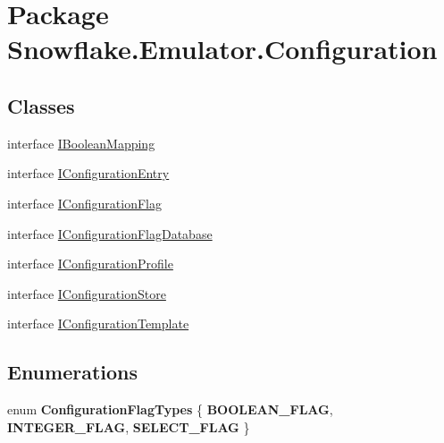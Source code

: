 \hypertarget{namespace_snowflake_1_1_emulator_1_1_configuration}{}\section{Package Snowflake.\+Emulator.\+Configuration}
\label{namespace_snowflake_1_1_emulator_1_1_configuration}
\subsection*{Classes}
\begin{DoxyCompactItemize}
\item 
interface \hyperlink{interface_snowflake_1_1_emulator_1_1_configuration_1_1_i_boolean_mapping}{I\+Boolean\+Mapping}
\item 
interface \hyperlink{interface_snowflake_1_1_emulator_1_1_configuration_1_1_i_configuration_entry}{I\+Configuration\+Entry}
\item 
interface \hyperlink{interface_snowflake_1_1_emulator_1_1_configuration_1_1_i_configuration_flag}{I\+Configuration\+Flag}
\item 
interface \hyperlink{interface_snowflake_1_1_emulator_1_1_configuration_1_1_i_configuration_flag_database}{I\+Configuration\+Flag\+Database}
\item 
interface \hyperlink{interface_snowflake_1_1_emulator_1_1_configuration_1_1_i_configuration_profile}{I\+Configuration\+Profile}
\item 
interface \hyperlink{interface_snowflake_1_1_emulator_1_1_configuration_1_1_i_configuration_store}{I\+Configuration\+Store}
\item 
interface \hyperlink{interface_snowflake_1_1_emulator_1_1_configuration_1_1_i_configuration_template}{I\+Configuration\+Template}
\end{DoxyCompactItemize}
\subsection*{Enumerations}
\begin{DoxyCompactItemize}
\item 
\hypertarget{namespace_snowflake_1_1_emulator_1_1_configuration_a2e92d84febdf23dc35b2ccdea8b599f2}{}enum {\bfseries Configuration\+Flag\+Types} \{ {\bfseries B\+O\+O\+L\+E\+A\+N\+\_\+\+F\+L\+A\+G}, 
{\bfseries I\+N\+T\+E\+G\+E\+R\+\_\+\+F\+L\+A\+G}, 
{\bfseries S\+E\+L\+E\+C\+T\+\_\+\+F\+L\+A\+G}
 \}\label{namespace_snowflake_1_1_emulator_1_1_configuration_a2e92d84febdf23dc35b2ccdea8b599f2}

\end{DoxyCompactItemize}
